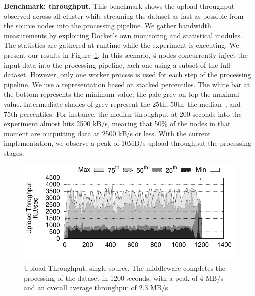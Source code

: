 \textbf{Benchmark: throughput.} This benchmark shows the upload throughput observed across all cluster while streaming the dataset as fast as possible from the source nodes into the processing pipeline.
We gather bandwidth measurements by exploiting Docker's own monitoring and statistical modules.
The statistics are gathered at runtime while the experiment is executing.
We present our results in Figure~\ref{fig:throughput}.
In this scenario, 4 nodes concurrently inject the input data into the processing pipeline, each one using a subset of the full dataset.
However, only one worker process is used for each step of the processing pipeline.
We use a representation based on stacked percentiles.
The white bar at the bottom represents the minimum value, the pale grey on top the maximal value.
Intermediate shades of grey represent the 25th, 50th–the median–, and 75th percentiles.
For instance, the median throughput at 200 seconds into the experiment almost hits 2500 kB/s, meaning that 50\% of the nodes in that moment are outputting data at 2500 kB/s or less.
With the current implementation, we observe a peak of 10MB/s upload throughput the processing stages.%


\begin{figure}[t!]
  \centering
  \includegraphics[scale=0.7]{../../experiment/results/throughput/outputs/tput_upload_4-datas-1-worker.pdf}
  \caption{Upload Throughput, single source. The middleware completes the processing of the dataset in 1200 seconds, with a peak of 4 MB/s and an overall average throughput of 2.3 MB/s}
  \label{fig:throughput}
\end{figure}

